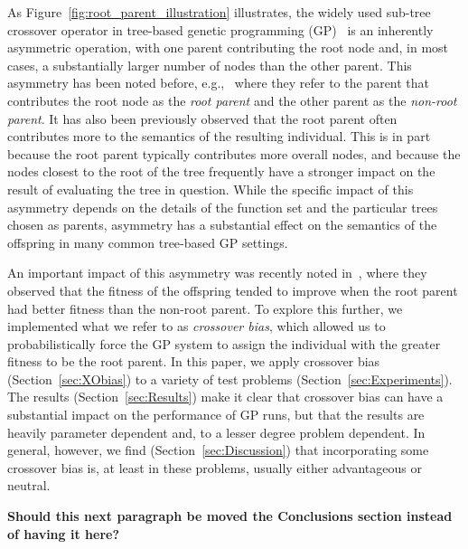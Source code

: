 \documentclass{sig-alternate}
\begin{document}
As Figure~\ref{fig:root_parent_illustration} illustrates, the widely used sub-tree crossover operator in tree-based 
genetic programming (GP)~\cite{poli08:fieldguide} is an inherently
asymmetric operation, with one parent contributing the root node and, in most cases, a substantially larger
number of nodes than the other parent. This asymmetry has been noted before, e.g.,~\cite{mcphee1999analysis}
where they refer to the parent that contributes the root node as the \emph{root parent} and the other parent as
the \emph{non-root parent}.
It has also been previously observed 
\cite{burlacu2013visualization, McPheeDonatucciDramdahl:2014,  McPhee:2008:SBB:1792694.1792707} 
that the root parent often contributes more to the semantics of the resulting 
individual. This is in part because the root parent typically contributes more 
overall nodes, and because the nodes closest to the root of the tree frequently have a stronger
impact on the result of evaluating the tree in question. While the specific impact of this asymmetry depends on the details of the function set and the particular trees chosen as parents,  asymmetry has a substantial effect on the semantics of the offspring in many common 
tree-based GP settings. 

An important impact of this asymmetry was recently noted in~\cite{McPheeDonatucciDramdahl:2014},
where they observed that the fitness of the offspring tended to improve when the root parent had better 
fitness than
the non-root parent.
To explore this further, we implemented what we refer to as \emph{crossover bias}, which allowed us to
probabilistically force the GP system to assign the individual with the greater 
fitness to be the root parent. In this paper, we apply crossover bias (Section~\ref{sec:XObias}) 
to a variety of test problems (Section~\ref{sec:Experiments}). The results 
(Section~\ref{sec:Results}) make it clear that crossover bias can have a substantial impact on the 
performance of GP runs, but that the results are heavily parameter dependent and, to a lesser degree 
problem dependent. In general, however, we find (Section~\ref{sec:Discussion}) that incorporating 
some crossover bias is, at least in these problems, usually either advantageous or neutral. 

\textbf{Should this next paragraph be moved the Conclusions section instead of having it here?}
\end{document}
